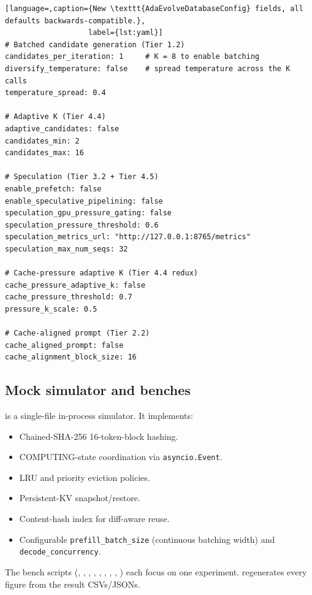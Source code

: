 \documentclass[11pt]{article}
\begin{document}
\begin{lstlisting}[language=,caption={New \texttt{AdaEvolveDatabaseConfig} fields, all defaults backwards-compatible.},
                   label={lst:yaml}]
# Batched candidate generation (Tier 1.2)
candidates_per_iteration: 1     # K = 8 to enable batching
diversify_temperature: false    # spread temperature across the K calls
temperature_spread: 0.4

# Adaptive K (Tier 4.4)
adaptive_candidates: false
candidates_min: 2
candidates_max: 16

# Speculation (Tier 3.2 + Tier 4.5)
enable_prefetch: false
enable_speculative_pipelining: false
speculation_gpu_pressure_gating: false
speculation_pressure_threshold: 0.6
speculation_metrics_url: "http://127.0.0.1:8765/metrics"
speculation_max_num_seqs: 32

# Cache-pressure adaptive K (Tier 4.4 redux)
cache_pressure_adaptive_k: false
cache_pressure_threshold: 0.7
pressure_k_scale: 0.5

# Cache-aligned prompt (Tier 2.2)
cache_aligned_prompt: false
cache_alignment_block_size: 16
\end{lstlisting}

\subsection{Mock simulator and benches}

 is a single-file in-process simulator. It
implements:
\begin{itemize}
  \item Chained-SHA-256 16-token-block hashing.
  \item COMPUTING-state coordination via \verb|asyncio.Event|.
  \item LRU and priority eviction policies.
  \item Persistent-KV snapshot/restore.
  \item Content-hash index for diff-aware reuse.
  \item Configurable \verb|prefill_batch_size| (continuous batching
    width) and \verb|decode_concurrency|.
\end{itemize}
The bench scripts (, ,
, ,
, ,
, ,
) each focus on one experiment.
 regenerates every figure from the result
CSVs/JSONs.
\end{document}
